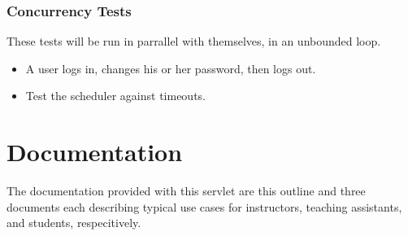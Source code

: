 \documentclass{article}
\begin{document}
\subsubsection{Concurrency Tests}\label{subsubsec:parrallel-stress}

These tests will be run in parrallel with themselves, in an unbounded loop.

\begin{itemize}
\item{A user logs in, changes his or her password, then logs out.}
\item{Test the scheduler against timeouts.}
\end{itemize}


\section{Documentation}\label{sec:docs}

The documentation provided with this servlet are this outline and three
documents each describing typical use cases for instructors, teaching
assistants, and students, respecitively.
\end{document}
